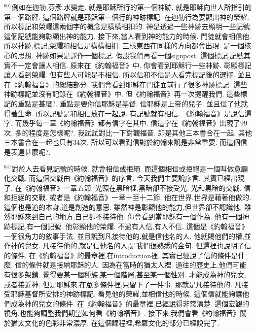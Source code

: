 \documentclass{book}
\begin{document}
$^{601}$例如在迦勒,芬彥,水變走.
就是耶穌所行的第一個神跡.
就是耶穌向世人所指引的第一個路牌.
這個路牌就是耶穌第一個行的神跡標記.
在迦勒行為要顯出神的榮耀.
所以標記和榮耀這兩個字的概念是橫橫相扣的.
神是透過一些神跡去顯明一些記號.
這個記號能夠彰顯出神的能力.
接下來,當人看到神的能力的時候.
門徒就會相信他.
所以神跡,標記,榮耀和相信是橫橫相扣.
三樣東西在同樣的方向都會出現.
是一個核心的思想.
神跡如果是譯作一個標記.
假設我們再看一個signpost.
這個標記,記號其實不一定會讓人相信.
原來在《約翰福音》中.
你會看到耶穌行一些神跡.
彰顯標記讓人看到榮耀.
但有些人可能是不相信.
所以信和不信是人看完標記後的選擇.
並且在《約翰福音》的總結部分.
我們會看到耶穌在門徒面前行了很多神跡標記.
這些神跡標記並沒有記錄在《約翰福音》中.
但《約翰福音》再一次提醒我們.
這些標記的重點是甚麼?.
重點是要你信耶穌是基督.
信耶穌是上帝的兒子.
並且信了他就得著生命.
所以記號是和相信放在一起說.
有記號就有相信.
《約翰福音》是說信這字.
而幾乎每一章《約翰福音》都有信字在其中.
信這字在《約翰福音》出現了99次.
多的程度是怎樣呢?.
我試試對比一下對觀福音.
即是其他三本書合在一起.
其他三本書合在一起也只有34次.
所以可以看到信對於約翰來說是非常重要.
而這個信是表達甚麼呢?.

$^{641}$對於人去看見記號的時候.
就會相信或拒絕.
而這個相信或拒絕是一個叫做意願化交戰.
而這個交戰由《約翰福音》的序言.
今天我們主要說序言.
其實已經出現了.
在《約翰福音》一章五節.
光照在黑暗裡,黑暗卻不接受光.
光和黑暗的交戰.
信和拒絕的交戰.
或者是《約翰福音》一章十至十二節.
他在世界,世界是藉著他做的.
這個也是道的本身,道是創造的意思.
雖然神是彰顯他的能力,但世界卻不認識他.
雖然耶穌來到自己的地方,自己卻不接待他.
你會看到當耶穌有一個作為.
他有一個神跡標記,有一個記號.
他彰顯他的榮耀.
不過有人信,有人不信.
這個是《約翰福音》一個很角力的敘事手法.
並且說到凡接待他的,就是信他名的人.
他就賜他們的權,並作神的兒女.
凡接待他的,就是信他名的人,是我們很熟悉的金句.
但這裡也說明了信的條件.
在《約翰福音》的最章裡,在introduction裡.
其實已經說了信的條件是什麼.
信的條件就是接納耶穌的人.
因為在當時的猶太人裡.
過往的歷史上,他們可能有很多架鎖.
覺得要某一個種族,某一個階層,甚至某一個性別.
才能成為神的兒女,或者接近神.
但是耶穌來,在眾多條件裡,只留下了一件事.
那就是凡接待他的.
凡接受耶穌基督所安排的神跡標記.
看見他的榮耀,並相信他的時候.
這個信就能夠讓他們成為神的兒女的條件.
在《約翰福音》的最章裡,已經說得非常清楚.
這個宏觀的視角,也能夠調整我們期望如何看《約翰福音》.
接下來,我們會看《約翰福音》關於猶太文化的色彩非常濃厚.
在這個課程裡,希羅文化的部分已經說完了.
\end{document}
